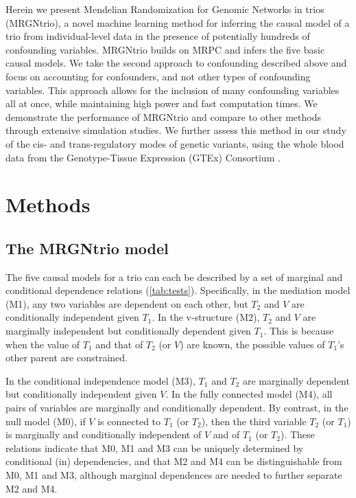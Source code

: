 \documentclass[12pt,letterpaper]{report}
\begin{document}
\begin{doublespace}
Herein we present Mendelian Randomization for Genomic Networks in trios (MRGNtrio), 
a novel machine learning method for inferring the causal model of a trio from individual-level data in the presence of potentially hundreds of confounding variables.  MRGNtrio builds on MRPC and infers the five basic causal models.   We take the second approach to confounding described above and focus on accounting for confounders, and not other types of confounding variables.  This approach allows for the inclusion of many confounding variables all at once, while maintaining high power and fast computation times. We demonstrate the performance of MRGNtrio and compare to other methods through extensive simulation studies.  We further assess this method in our study of the cis- and trans-regulatory modes of genetic variants, using the whole blood data from the Genotype-Tissue Expression (GTEx) Consortium \cite{gtex2020}. 

\section{Methods}
\subsection{The MRGNtrio model}

The five causal models for a trio can each be described by a set of marginal and conditional dependence relations (\autoref{tab:tests}). Specifically, in the mediation model (M1), any two variables are dependent on each other, but $T_2$ and $V$ are conditionally independent given $T_1$.  In the v-structure (M2), $T_2$ and $V$ are marginally independent but conditionally dependent given $T_1$. This is because when the value of $T_1$ and that of $T_2$ (or $V$) are known, the possible values of $T_1$'s other parent are constrained.  

In the conditional independence model (M3), $T_1$ and $T_2$ are marginally dependent but conditionally independent given $V$. In the fully connected model (M4), all pairs of variables are marginally and conditionally dependent. By contrast, in the null model (M0), if $V$ is connected to $T_1$ (or $T_2$), then the third variable $T_2$ (or $T_1$) is marginally and conditionally independent of $V$ and of $T_1$ (or $T_2$). These relations indicate that M0, M1 and M3 can be uniquely determined by conditional (in) dependencies, and that M2 and M4 can be distinguishable from M0, M1 and M3, although marginal dependences are needed to further separate M2 and M4.


\end{doublespace}
\end{document}
